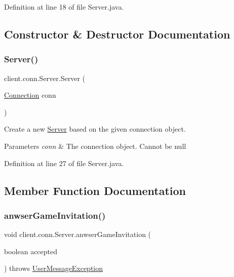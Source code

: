 Definition at line 18 of file Server.\+java.



\subsection{Constructor \& Destructor Documentation}
\hypertarget{classclient_1_1conn_1_1_server_aea9f06e94bc3d3653c06b192ba097a14}{}\label{classclient_1_1conn_1_1_server_aea9f06e94bc3d3653c06b192ba097a14} 
\subsubsection{\texorpdfstring{Server()}{Server()}}
{\footnotesize\ttfamily client.\+conn.\+Server.\+Server (\begin{DoxyParamCaption}\item[{\hyperlink{classsharedlib_1_1conn_1_1_connection}{Connection}}]{conn }\end{DoxyParamCaption})}

Create a new \hyperlink{classclient_1_1conn_1_1_server}{Server} based on the given connection object. 
\begin{DoxyParams}{Parameters}
{\em conn} & The connection object. Cannot be null \\
\hline
\end{DoxyParams}


Definition at line 27 of file Server.\+java.



\subsection{Member Function Documentation}
\hypertarget{classclient_1_1conn_1_1_server_a28692c894a8055b95dd493fbaec8b567}{}\label{classclient_1_1conn_1_1_server_a28692c894a8055b95dd493fbaec8b567} 
\subsubsection{\texorpdfstring{anwser\+Game\+Invitation()}{anwserGameInvitation()}}
{\footnotesize\ttfamily void client.\+conn.\+Server.\+anwser\+Game\+Invitation (\begin{DoxyParamCaption}\item[{boolean}]{accepted }\end{DoxyParamCaption}) throws \hyperlink{classsharedlib_1_1exceptions_1_1_user_message_exception}{User\+Message\+Exception}}

